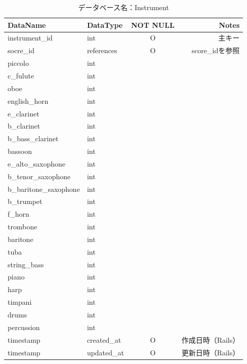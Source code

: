 \begin{table}[p]
	\caption{データベース名：Instrument}
	\begin{tabularx}{\textwidth}{llcR}
		\hline
		DataName               & DataType    & NOT NULL & Notes        \\
		\hline
		instrument\_id         & int         & O        & 主キー          \\
		socre\_id              & references  & O        & score\_idを参照 \\
		piccolo                & int         &          &              \\
		c\_fulute              & int         &          &              \\
		oboe                   & int         &          &              \\
		english\_horn          & int         &          &              \\
		e\_clarinet            & int         &          &              \\
		b\_clarinet            & int         &          &              \\
		b\_bass\_clarinet      & int         &          &              \\
		bassoon                & int         &          &              \\
		e\_alto\_saxophone     & int         &          &              \\
		b\_tenor\_saxophone    & int         &          &              \\
		b\_baritone\_saxophone & int         &          &              \\
		b\_trumpet             & int         &          &              \\
		f\_horn                & int         &          &              \\
		trombone               & int         &          &              \\
		baritone               & int         &          &              \\
		tuba                   & int         &          &              \\
		string\_bass           & int         &          &              \\
		piano                  & int         &          &              \\
		harp                   & int         &          &              \\
		timpani                & int         &          &              \\
		drums                  & int         &          &              \\
		percussion             & int         &          &              \\
		{{timestamp}}          & created\_at & O        & 作成日時（Rails）  \\
		{{timestamp}}          & updated\_at & O        & 更新日時（Rails）  \\
		\hline
	\end{tabularx}
	\label{tableDesgin2}
\end{table}